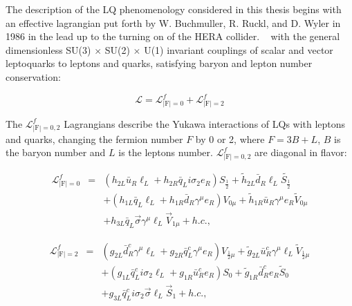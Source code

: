 The description of the LQ phenomenology considered in this thesis begins with an effective lagrangian put forth by W. Buchmuller, R. Ruckl, and D. Wyler in 1986 in the lead up to the turning on of the HERA collider.  ~\cite{Belyaev:2005ew,Buchmuller:1986zs} with the general dimensionless SU(3) $\times$ SU(2) $\times$ U(1) invariant couplings of scalar and vector leptoquarks to leptons and quarks, satisfying baryon and lepton number conservation:


\begin{equation}
\mathcal{L} = \mathcal{L}^{f}_{|\text{F}|=0} + \mathcal{L}^{f}_{|\text{F}|=2}
\label{eq:LQsmalllagrangian}
\end{equation}

The $\mathcal{L}^{f}_{|\text{F}|=0,2}$ Lagrangians describe the Yukawa interactions of LQs with leptons and quarks, changing the fermion number $F$ by 0 or 2, where $F=3B+L$, $B$ is the baryon number and $L$ is the leptons number.  $\mathcal{L}^{f}_{|\text{F}|=0,2}$ are diagonal in flavor:



\begin{eqnarray}
\mathcal{L}^{f}_{|\text{F}|=0} &=& (h_{2L}\bar{u}_{R}\ell_{L}+h_{2R}\bar{q}_{L}i\sigma_{2}e_{R})S_{\frac{1}{2}} +\tilde{h}_{2L}\bar{d}_{R}\ell_{L}\tilde{S_{\frac{1}{2}}} \nonumber\\
&& +(h_{1L}\bar{q}_{L}\ell_{L}+h_{1R}\bar{d}_{R}\gamma^{\mu}e_{R})V_{0\mu} +\tilde{h}_{1R}\bar{u}_{R}\gamma^{\mu}e_{R}\tilde{V}_{0\mu} \nonumber\\
&&+h_{3L}\bar{q}_{L}\vec{\sigma}\gamma^{\mu}\ell_{L}\vec{V}_{1\mu} +h.c.
\label{eq:LQlagrangianF0},
\end{eqnarray}


\begin{eqnarray}
\mathcal{L}^{f}_{|\text{F}|=2} &=& (g_{2L}\bar{d}^{c}_{R}\gamma^{\mu}\ell_{L}+g_{2R}\bar{q}^{c}_{L}\gamma^{\mu}e_{R})V_{\frac{1}{2}\mu} + \tilde{g}_{2L}\bar{u}^{c}_{R}\gamma^{\mu}\ell_{L}\tilde{V}_{\frac{1}{2}\mu} \nonumber \\
&& +(g_{1L}\bar{q}^{c}_{L}i\sigma_{2}\ell_{L}+g_{1R}\bar{u}^c_{R}e_{R})S_{0}+\tilde{g}_{1R}\bar{d}^c_{R}e_{R}\tilde{S}_{0}  \nonumber \\
&& +g_{3L}\bar{q}^{c}_{L}i\sigma_{2}\vec{\sigma}\ell_{L}\vec{S}_{1} +h.c.
\label{eq:LQlagrangianF2},
\end{eqnarray}


